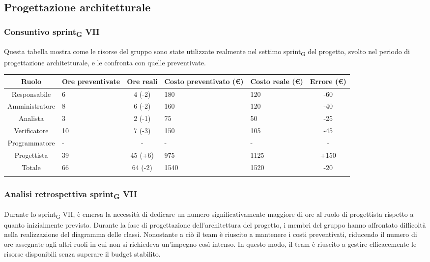 \newpage
\subsection{Progettazione architetturale}
%
\subsubsection{Consuntivo sprint\textsubscript{G} VII}

Questa tabella mostra come le risorse del gruppo sono state utilizzate realmente nel settimo sprint\textsubscript{G} del progetto, svolto nel periodo di progettazione architetturale, e le confronta con quelle preventivate.

\setlength\extrarowheight{5pt}
\begin{tabularx}{\textwidth}{|c|XcXX|c|}
	\hline
	\rowcolor{white}
	\textbf{Ruolo} & \textbf{Ore preventivate} & \textbf{Ore reali} & \textbf{Costo preventivato (€)} & \textbf{Costo reale (€)} & \textbf{Errore (€)} \\
	\hline
	Responsabile & 6 & 4 (-2) & 180 & 120 & -60 \\
	Amministratore & 8 & 6 (-2) & 160 & 120 & -40 \\
	Analista & 3 & 2 (-1) & 75 & 50 & -25 \\
	Verificatore & 10 & 7 (-3) & 150 & 105 & -45 \\
	Programmatore & - & - & - & - & - \\
	Progettista & 39 & 45 (+6) & 975 & 1125 & +150 \\
	\hline
	Totale & 66 & 64 (-2) & 1540 & 1520 & -20 \\
	\hline
	\rowcolor{white}
	\caption{Consuntivo ore e costi per ruolo del settimo sprint\textsubscript{G}}
\end{tabularx}
\subsubsection{Analisi retrospettiva sprint\textsubscript{G} VII}

Durante lo sprint\textsubscript{G} VII, è emersa la necessità di dedicare un numero significativamente maggiore di ore al ruolo di progettista rispetto a quanto 
inizialmente previsto. Durante la fase di progettazione dell'architettura del progetto, i membri del gruppo hanno affrontato difficoltà nella realizzazione 
del diagramma delle classi. Nonostante a ciò il team è riuscito a mantenere i costi preventivati, riducendo il numero di ore assegnate agli altri 
ruoli in cui non si richiedeva un'impegno così intenso. In questo modo, il team è riuscito a gestire efficacemente le risorse disponibili senza superare il 
budget stabilito.

